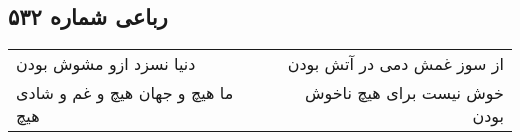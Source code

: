 \begin{center}
\section*{رباعی شماره ۵۳۲}
\label{sec:sh532}
\begin{longtable}{l p{0.5cm} r}
دنیا نسزد ازو مشوش بودن
&&
از سوز غمش دمی در آتش بودن
\\
ما هیچ و جهان هیچ و غم و شادی هیچ
&&
خوش نیست برای هیچ ناخوش بودن
\\
\end{longtable}
\end{center}
